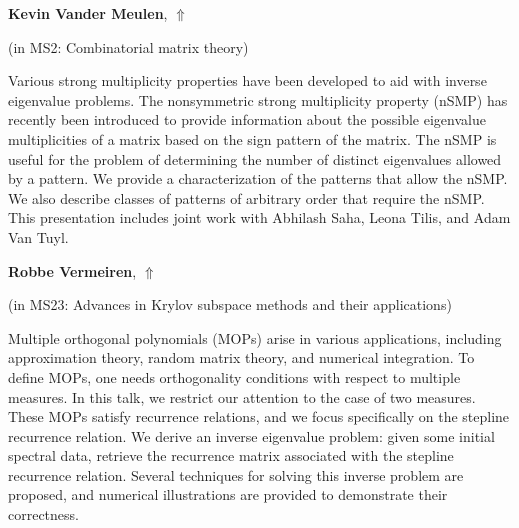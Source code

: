 \documentclass[ILAS2025-program.tex]{subfiles}
\begin{document}
\hypertarget{down0142}{}\begin{ilasabstract}
    
\textbf{Kevin Vander Meulen},  \hfill \hyperlink{up0142}{$\Uparrow$}
    
    
(in {\color{mstitle}MS2: Combinatorial matrix theory})
        
\mtskip
    Various strong multiplicity properties have been developed to aid
with inverse eigenvalue problems. The nonsymmetric strong multiplicity
property (nSMP) has recently been introduced to provide information
about the possible eigenvalue multiplicities of a matrix based on the
sign pattern of the matrix. The nSMP is useful for the problem
of determining the number of distinct eigenvalues allowed by a pattern.
We provide a characterization of the patterns that allow
the nSMP. We also describe classes of patterns of arbitrary order
that require the nSMP. This presentation includes joint work
with Abhilash Saha, Leona Tilis, and Adam Van Tuyl.

\end{ilasabstract}
    

\hypertarget{down0392}{}\begin{ilasabstract}
    
\textbf{Robbe Vermeiren},  \hfill \hyperlink{up0392}{$\Uparrow$}
    
    
(in {\color{mstitle}MS23: Advances in Krylov subspace methods and their applications})
        
\mtskip
    Multiple orthogonal polynomials (MOPs) arise in various applications, including approximation theory, random matrix theory, and numerical integration. To define MOPs, one needs orthogonality conditions with respect to multiple measures. In this talk, we restrict our attention to the case of two measures. These MOPs satisfy recurrence relations, and we focus specifically on the stepline recurrence relation.
We derive an inverse eigenvalue problem: given some initial spectral data, retrieve the recurrence matrix associated with the stepline recurrence relation. Several techniques for solving this inverse problem are proposed, and numerical illustrations are provided to demonstrate their correctness.

\end{ilasabstract}
    
\end{document}
